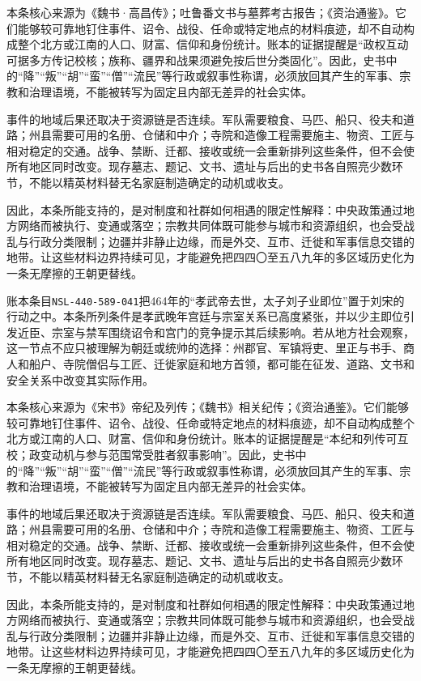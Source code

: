 本条核心来源为《魏书·高昌传》；吐鲁番文书与墓葬考古报告；《资治通鉴》。它们能够较可靠地钉住事件、诏令、战役、任命或特定地点的材料痕迹，却不自动构成整个北方或江南的人口、财富、信仰和身份统计。账本的证据提醒是“政权互动可据多方传记校核；族称、疆界和战果须避免按后世分类固化”。因此，史书中的“降”“叛”“胡”“蛮”“僧”“流民”等行政或叙事性称谓，必须放回其产生的军事、宗教和治理语境，不能被转写为固定且内部无差异的社会实体。

事件的地域后果还取决于资源链是否连续。军队需要粮食、马匹、船只、役夫和道路；州县需要可用的名册、仓储和中介；寺院和造像工程需要施主、物资、工匠与相对稳定的交通。战争、禁断、迁都、接收或统一会重新排列这些条件，但不会使所有地区同时改变。现存墓志、题记、文书、遗址与后出的史书各自照亮少数环节，不能以精英材料替无名家庭制造确定的动机或收支。

因此，本条所能支持的，是对制度和社群如何相遇的限定性解释：中央政策通过地方网络而被执行、变通或落空；宗教共同体既可能参与城市和资源组织，也会受战乱与行政分类限制；边疆并非静止边缘，而是外交、互市、迁徙和军事信息交错的地带。让这些材料边界持续可见，才能避免把四四〇至五八九年的多区域历史化为一条无摩擦的王朝更替线。

账本条目\texttt{NSL-440-589-041}把464年的“孝武帝去世，太子刘子业即位”置于刘宋的行动之中。本条所列条件是孝武晚年宫廷与宗室关系已高度紧张，并以少主即位引发近臣、宗室与禁军围绕诏令和宫门的竞争提示其后续影响。若从地方社会观察，这一节点不应只被理解为朝廷或统帅的选择：州郡官、军镇将吏、里正与书手、商人和船户、寺院僧侣与工匠、迁徙家庭和地方首领，都可能在征发、道路、文书和安全关系中改变其实际作用。

本条核心来源为《宋书》帝纪及列传；《魏书》相关纪传；《资治通鉴》。它们能够较可靠地钉住事件、诏令、战役、任命或特定地点的材料痕迹，却不自动构成整个北方或江南的人口、财富、信仰和身份统计。账本的证据提醒是“本纪和列传可互校；政变动机与参与范围常受胜者叙事影响”。因此，史书中的“降”“叛”“胡”“蛮”“僧”“流民”等行政或叙事性称谓，必须放回其产生的军事、宗教和治理语境，不能被转写为固定且内部无差异的社会实体。

事件的地域后果还取决于资源链是否连续。军队需要粮食、马匹、船只、役夫和道路；州县需要可用的名册、仓储和中介；寺院和造像工程需要施主、物资、工匠与相对稳定的交通。战争、禁断、迁都、接收或统一会重新排列这些条件，但不会使所有地区同时改变。现存墓志、题记、文书、遗址与后出的史书各自照亮少数环节，不能以精英材料替无名家庭制造确定的动机或收支。

因此，本条所能支持的，是对制度和社群如何相遇的限定性解释：中央政策通过地方网络而被执行、变通或落空；宗教共同体既可能参与城市和资源组织，也会受战乱与行政分类限制；边疆并非静止边缘，而是外交、互市、迁徙和军事信息交错的地带。让这些材料边界持续可见，才能避免把四四〇至五八九年的多区域历史化为一条无摩擦的王朝更替线。

